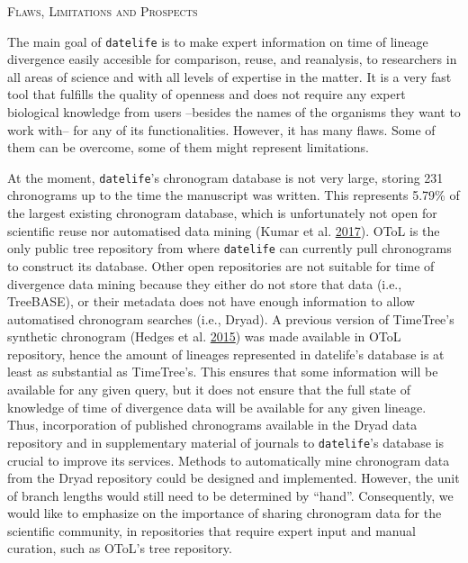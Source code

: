 \documentclass[]{article}
\begin{document}
\begin{center}
\textsc{Flaws, Limitations and Prospects}
\end{center}

The main goal of \texttt{datelife} is to make expert information on time of lineage divergence easily accesible for comparison, reuse, and reanalysis, to researchers in all areas of science and with all levels of expertise in the matter. It is a very fast tool that fulfills the quality of openness and does not require any expert biological knowledge from users --besides the names of the organisms they want to work with-- for any of its functionalities. However, it has many flaws. Some of them can be overcome, some of them might represent limitations.

At the moment, \texttt{datelife}'s chronogram database is not very large, storing 231 chronograms up to the time the manuscript was written. This represents 5.79\% of the largest existing chronogram database, which is unfortunately not open for scientific reuse nor automatised data mining (Kumar et al. \protect\hyperlink{ref-Kumar2017}{2017}). OToL is the only public tree repository from where \texttt{datelife} can currently pull chronograms to construct its database. Other open repositories are not suitable for time of divergence data mining because they either do not store that data (i.e., TreeBASE), or their metadata does not have enough information to allow automatised chronogram searches (i.e., Dryad).
A previous version of TimeTree's synthetic chronogram (Hedges et al. \protect\hyperlink{ref-Hedges2015}{2015}) was made available in OToL repository, hence the amount of lineages represented in datelife's database is at least as substantial as TimeTree's.
This ensures that some information will be available for any given query, but it does not ensure that the full state of knowledge of time of divergence data will be available for any given lineage.
Thus, incorporation of published chronograms available in the Dryad data repository and in supplementary material of journals to \texttt{datelife}'s database is crucial to improve its services.
Methods to automatically mine chronogram data from the Dryad repository could be designed and implemented. However, the unit of branch lengths would still need to be determined by ``hand''.
Consequently, we would like to emphasize on the importance of sharing chronogram data for the scientific community, in repositories that require expert input and manual curation, such as OToL's tree repository.
\end{document}
